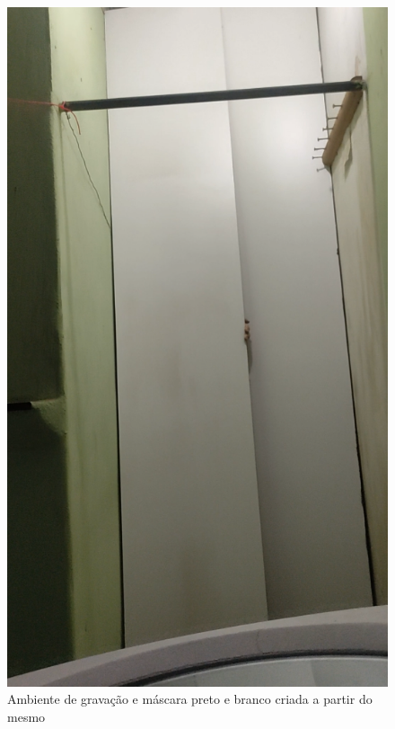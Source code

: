 \begin{figure}[htb]
    \centering
    \caption{Ambiente de gravação e máscara preto e branco criada a partir do mesmo}
        \begin{minipage}{0.4\textwidth}
            \includegraphics[width=\textwidth]{figuras/filter/mask/ambiente.png}
        \end{minipage}
        \begin{minipage}{0.4\textwidth}

\end{minipage}
\end{figure}
